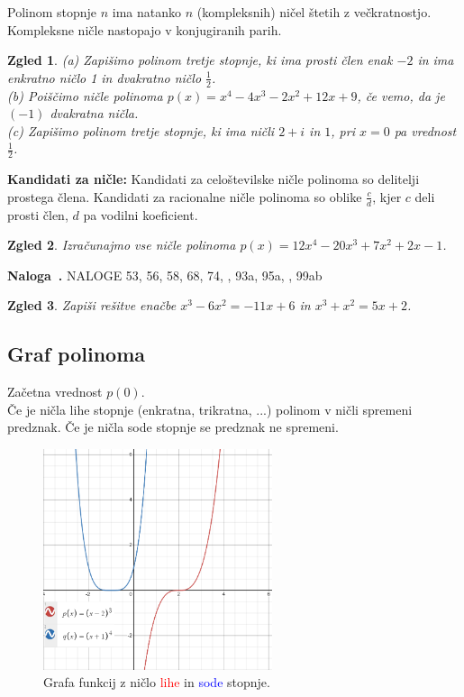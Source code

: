 \documentclass{article}
\newcounter{example}[section]
\newenvironment{example}[1][]{\refstepcounter{example}\par\medskip
   \noindent \textbf{Naloga~\theexample. #1} \rmfamily}{\medskip}
\newtheorem*{zgled}{Zgled}
\begin{document}
Polinom stopnje $n$ ima natanko $n$ (kompleksnih) ničel štetih z večkratnostjo. Kompleksne ničle nastopajo v konjugiranih parih.

\begin{zgled}
    (a) Zapišimo polinom tretje stopnje, ki ima prosti člen enak $-2$ in ima enkratno ničlo 1 in dvakratno ničlo $\frac{1}{2}$.\\
    (b) Poiščimo ničle polinoma $p(x)=x^4-4x^3-2x^2+12x+9$, če vemo, da je $(-1)$ dvakratna ničla.\\
    (c) Zapišimo polinom tretje stopnje, ki ima ničli $2+i$ in $1$, pri $x=0$ pa vrednost $\frac{1}{2}$.\\
\end{zgled}

\textbf{Kandidati za ničle:} Kandidati za celoštevilske ničle polinoma so delitelji prostega člena. Kandidati za racionalne ničle polinoma so oblike $\frac{c}{d}$, kjer $c$ deli prosti člen, $d$ pa vodilni koeficient.

\begin{zgled}
    Izračunajmo vse ničle polinoma $p(x)=12x^4-20x^3+7x^2+2x-1$.
\end{zgled}

\begin{example}
    NALOGE 53, 56, 58, 68, 74, , 93a, 95a, , 99ab
\end{example}

\begin{zgled}
    Zapiši rešitve enačbe $x^3-6x^2=-11x+6$ in $x^3+x^2=5x+2$.
\end{zgled}


\subsection{Graf polinoma}

Začetna vrednost $p(0)$.\\
Če je ničla lihe stopnje (enkratna, trikratna, ...) polinom v ničli spremeni predznak. Če je ničla sode stopnje se predznak ne spremeni.

\begin{figure}[H]
\includegraphics[width=0.6\textwidth]{polinomi.grafi.png}
\centering
\caption{Grafa funkcij z ničlo \textcolor{red}{lihe} in \textcolor{blue}{sode} stopnje.}
\centering
\end{figure}
\end{document}
